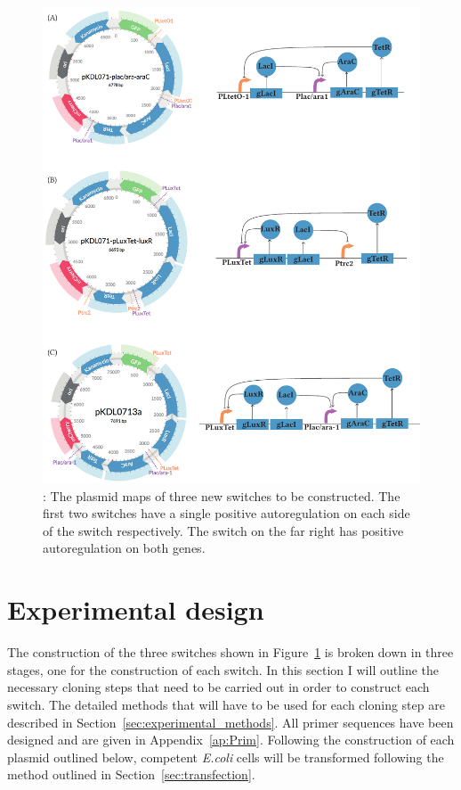\begin{figure}[htbp]
	\begin{center}
		\includegraphics[scale=0.7]{../../chapters/chapterDesignSwitches/images/final-plasmids.pdf}
		\caption[The plasmid maps of three new switches to be constructed.]{\label{fig:finalpl}: The plasmid maps of three new switches to be constructed. The first two switches have a single positive autoregulation on each side of the switch respectively. The switch on the far right has positive autoregulation on both genes. }
	\end{center}
\end{figure}

\section{Experimental design}

The construction of the three switches shown in Figure~\ref{fig:finalpl} is broken down in three stages, one for the construction of each switch. In this section I will outline the necessary cloning steps that need to be carried out in order to construct each switch. The detailed methods that will have to be used for each cloning step are described in Section~\ref{sec:experimental_methods}. All primer sequences have been designed and are given in Appendix~\ref{ap:Prim}. Following the construction of each plasmid outlined below, competent \textit{E.coli} cells will be transformed following the method outlined in Section~\ref{sec:transfection}.

